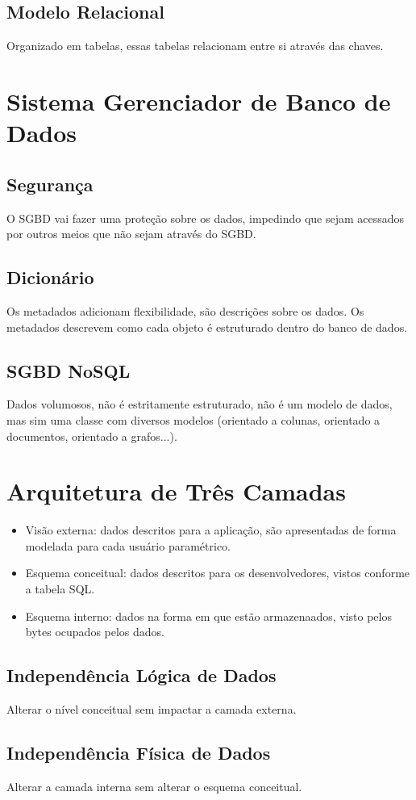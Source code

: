 \documentclass[ ]{article}
\begin{document}
		\subsection{Modelo Relacional}
			Organizado em tabelas, essas tabelas relacionam entre si através das chaves.
	\section{Sistema Gerenciador de Banco de Dados}
		\subsection{Segurança}
			O SGBD vai fazer uma proteção sobre os dados, impedindo que sejam acessados por outros meios que não sejam através do SGBD.
		\subsection{Dicionário}
			Os metadados adicionam flexibilidade, são descrições sobre os dados. Os metadados descrevem como cada objeto é estruturado dentro do banco de dados.
		\subsection{SGBD NoSQL}
			Dados volumosos, não é estritamente estruturado, não é um modelo de dados, mas sim uma classe com diversos modelos (orientado a colunas, orientado a documentos, orientado a grafos...).
	\section{Arquitetura de Três Camadas}
		\begin{itemize}
			\item Visão externa: dados descritos para a aplicação, são apresentadas de forma modelada para cada usuário paramétrico.
			\item Esquema conceitual: dados descritos para os desenvolvedores, vistos conforme a tabela SQL.
			\item Esquema interno:	 dados na forma em que estão armazenaados, visto pelos bytes ocupados pelos dados.
		\end{itemize}
		\subsection{Independência Lógica de Dados}
			Alterar o nível conceitual sem impactar a camada externa.
		\subsection{Independência Física de Dados}
			Alterar a camada interna sem alterar o esquema conceitual.
\end{document}
